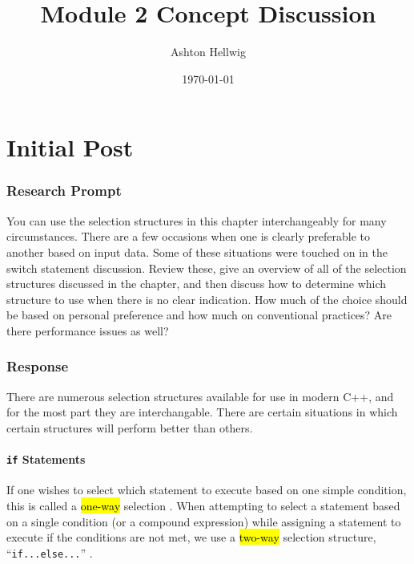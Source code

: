 \documentclass[12pt]{report}
\title{Module 2 Concept Discussion}
\author{Ashton Hellwig}
\date{\today}
\newcommand{\CiteSection}[2]{%
    \parencite[~\S {#2}]{#1}
  }
\theoremstyle{definition}
\theoremstyle{plain}
\theoremstyle{plain}
\begin{document}
  \maketitle
  \tableofcontents
  \newpage


  \part{Initial Post}

    \section{Research Prompt}
      \begin{mdframed}[backgroundcolor=green!20]
        You can use the selection structures in this chapter interchangeably
          for many circumstances. There are a few occasions when one is clearly
          preferable to another based on input data. Some of these situations
          were touched on in the switch statement discussion. Review these, give
          an overview of all of the selection structures discussed in the
          chapter, and then discuss how to determine which structure to use when
          there is no clear indication. How much of the choice should be based
          on personal preference and how much on conventional practices? Are
          there performance issues as well?
      \end{mdframed}

    \section{Response}
      There are numerous selection structures available for use in modern C++,
        and for the most part they are interchangable. There are certain
        situations in which certain structures will perform better than others.

      \subsection{\texttt{if} Statements}
        If one wishes to select which statement to execute based on one simple
          condition, this is called a \hl{one-way} selection
          \CiteSection{malik_2015}{4-1d}. When attempting to select a statement
          based on a single condition (or a compound expression) while assigning
          a statement to execute if the conditions are not met, we use a
          \hl{two-way} selection structure, ``\texttt{if...else...}''
          \CiteSection{malik_2015}{4-1e}.
\end{document}
